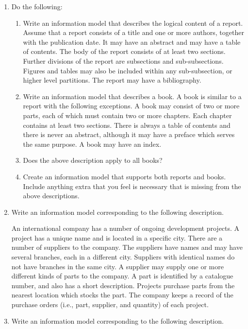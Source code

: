 \documentclass{article}
\newenvironment{exercises}{\begin{enumerate}}{\end{enumerate}}
\begin{document}
\begin{exercises}
\item Do the following:
  \begin{enumerate}
  \item Write an information model that describes the logical content of 
        a report. Assume that a report consists of a title and one or 
        more authors, together with the publication date. It may have 
        an abstract and may have a table of
        contents. The body of the report consists of at least two sections.
        Further divisions of the report are subsections and sub-subsections.
        Figures and tables may also be included within any sub-subsection, or
        higher level partitions. The report may have a bibliography.
  \item Write an information model that describes a book. A book is similar 
        to a report with the following exceptions. A book may consist of 
        two or more parts, each of which must contain two or more chapters. 
        Each chapter contains at least two sections. There is always a table 
        of contents and there is never an abstract, although it may have 
        a preface which serves the same purpose. A book may have an index.
  \item Does the above description apply to all books?
  \item Create an information model that supports both reports and books. 
        Include anything extra that you feel is necessary that is missing 
        from the above descriptions.
  \end{enumerate}

\item Write an information model corresponding to the following description.

    An international company has a number of ongoing development projects. 
A project has a unique name and is located in a specific city. There are 
a number of suppliers to the company. The suppliers have names and may have
several branches, each in a different city. Suppliers with identical names 
do not have branches in the same city. A supplier may supply one or more 
different kinds of parts to the company. A part is identified by a catalogue 
number, and also has a short description. Projects purchase parts from 
the nearest location which stocks the part. The company keeps a record 
of the purchase orders (i.e., part, supplier, and quantity) of each project.

\item Write an information model corresponding to the following description.


\end{exercises}
\end{document}
